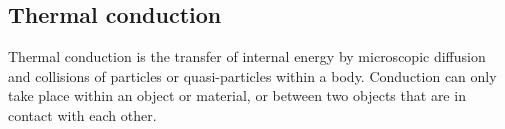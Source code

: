 \subsection{Thermal conduction}
Thermal conduction is the transfer of internal energy by microscopic diffusion and collisions of particles or quasi-particles within a body.
Conduction can only take place within an object or material, or between two objects that are in contact with each other.


